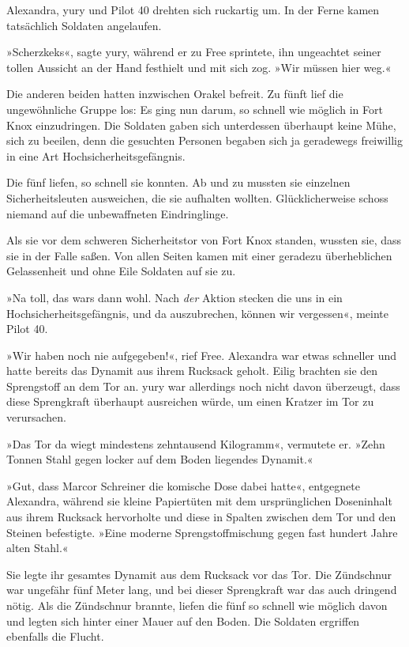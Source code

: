 Alexandra, yury und Pilot 40 drehten sich ruckartig um. In der Ferne kamen tatsächlich Soldaten angelaufen.

»Scherzkeks«, sagte yury, während er zu Free sprintete, ihn ungeachtet seiner tollen Aussicht an der Hand festhielt und mit sich zog. »Wir müssen hier weg.«

Die anderen beiden hatten inzwischen Orakel befreit. Zu fünft lief die ungewöhnliche Gruppe los: Es ging nun darum, so schnell wie möglich in Fort Knox einzudringen. Die Soldaten gaben sich unterdessen überhaupt keine Mühe, sich zu beeilen, denn die gesuchten Personen begaben sich ja geradewegs freiwillig in eine Art Hochsicherheitsgefängnis.

Die fünf liefen, so schnell sie konnten. Ab und zu mussten sie einzelnen Sicherheitsleuten ausweichen, die sie aufhalten wollten. Glücklicherweise schoss niemand auf die unbewaffneten Eindringlinge.

Als sie vor dem schweren Sicherheitstor von Fort Knox standen, wussten sie, dass sie in der Falle saßen. Von allen Seiten kamen mit einer geradezu überheblichen Gelassenheit und ohne Eile Soldaten auf sie zu.

»Na toll, das wars dann wohl. Nach \textit{der} Aktion stecken die uns in ein Hochsicherheitsgefängnis, und da auszubrechen, können wir vergessen«, meinte Pilot 40.

»Wir haben noch nie aufgegeben!«, rief Free. Alexandra war etwas schneller und hatte bereits das Dynamit aus ihrem Rucksack geholt. Eilig brachten sie den Sprengstoff an dem Tor an. yury war allerdings noch nicht davon überzeugt, dass diese Sprengkraft überhaupt ausreichen würde, um einen Kratzer im Tor zu verursachen.

»Das Tor da wiegt mindestens zehntausend Kilogramm«, vermutete er. »Zehn Tonnen Stahl gegen locker auf dem Boden liegendes Dynamit.«

»Gut, dass Marcor Schreiner die komische Dose dabei hatte«, entgegnete Alexandra, während sie kleine Papiertüten mit dem ursprünglichen Doseninhalt aus ihrem Rucksack hervorholte und diese in Spalten zwischen dem Tor und den Steinen befestigte. »Eine moderne Sprengstoffmischung gegen fast hundert Jahre alten Stahl.«

Sie legte ihr gesamtes Dynamit aus dem Rucksack vor das Tor. Die Zündschnur war ungefähr fünf Meter lang, und bei dieser Sprengkraft war das auch dringend nötig. Als die Zündschnur brannte, liefen die fünf so schnell wie möglich davon und legten sich hinter einer Mauer auf den Boden. Die Soldaten ergriffen ebenfalls die Flucht.

